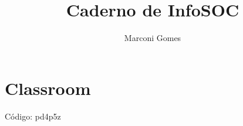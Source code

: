 \documentclass[11pt, a4paper]{article}
\begin{document}
\title{Caderno de InfoSOC}
\author{Marconi Gomes}

\maketitle


\section{Classroom}
    Código: pd4p5z
\end{document}

